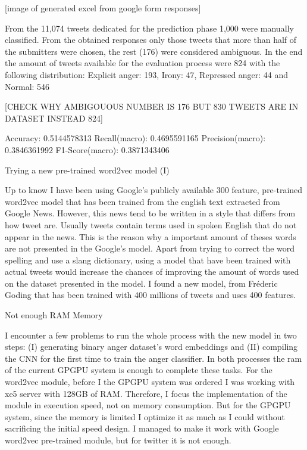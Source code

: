 [image of generated excel from google form responses]

From the 11,074 tweets dedicated for the prediction phase 1,000 were manually classified. From the obtained responses only those tweets that more than half of the submitters were chosen, the rest (176) were considered ambiguous.
In the end the amount of tweets available for the evaluation process were 824 with the following distribution:
Explicit anger: 193, Irony: 47, Repressed anger: 44 and Normal: 546

[CHECK WHY AMBIGOUOUS NUMBER IS 176 BUT 830 TWEETS ARE IN DATASET INSTEAD 824]

Accuracy: 0.5144578313
Recall(macro): 0.4695591165
Precision(macro): 0.3846361992
F1-Score(macro): 0.3871343406

Trying a new pre-trained word2vec model (I)

Up to know I have been using Google’s publicly available 300 feature, pre-trained word2vec model that has been trained from the english text extracted from Google News.
However, this news tend to be written in a style that differs from how tweet are. Usually tweets contain terms used in spoken English that do not appear in the news. This is the reason why a important amount of theses words are not presented in the Google’s model. Apart from trying to correct the word spelling and use a slang dictionary, using a model that have been trained with actual tweets would increase the chances of improving the amount of words used on the dataset presented in the model.
I found a new model, from Fréderic Goding\cite{godin2015multimedia} that has been trained with 400 millions of tweets and uses 400 features.

Not enough RAM Memory

I encounter a few problems to run the whole process with the new model in two steps: (I) generating binary anger dataset’s word embeddings and (II) compiling the CNN for the first time to train the anger classifier. In both processes the ram of the current GPGPU system is enough to complete these tasks. 
For the word2vec module, before I the GPGPU system was ordered I was working with xe5 server with 128GB of RAM. Therefore, I focus the implementation of the module in execution speed, not on memory consumption. But for the GPGPU system, since the memory is limited I optimize it as much as I could without sacrificing the initial speed design. I managed to make it work with Google word2vec pre-trained module, but for twitter it is not enough.

